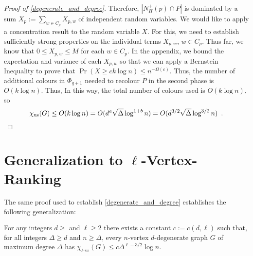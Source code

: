 \documentclass{patmorin}
\newcommand{\rn}[1]{\chi_{\operatorname{#1-vr}}}
\newcommand{\trn}{\chi_{\mathrm{us}}}
\newcommand{\lrn}{\rn{\ell}}
\begin{document}
\begin{proof}[Proof of \cref{degenerate_and_degree}]
  Therefore, $|N_H^+(p)\cap P|$ is dominated by a sum $X_p:=\sum_{w\in C_p} X_{p,w}$ of independent random variables.  We would like to apply a concentration result to the random variable $X$.  For this, we need to  establish sufficiently strong properties on the individual terms $X_{p,w}$, $w\in C_p$.  Thus far, we know that $0\le X_{p,w}\le M$ for each $w\in C_p$. In the appendix, we bound the expectation and variance of each $X_{p,w}$ so that we can apply a Bernstein Inequality to prove that $\Pr(X\ge ck\log n)\le n^{-\Omega(c)}$.  Thus, the number of additional colours in $\Phi_{q+1}$ needed to recolour $P$ in the second phase is $O(k\log n)$.  Thus, In this way, the total number of colours used is $O(k\log n)$, so
  \[
    \trn(G) \le O(k \log n) = O(d^a\sqrt{\Delta}\log^{1+b} n) = O(d^{3/2}\sqrt{\Delta}\log^{3/2} n) \enspace . \qedhere
  \]
\end{proof}

\section{Generalization to $\ell$-Vertex-Ranking}

The same proof used to establish \cref{degenerate_and_degree} establishes the following generalization:

\begin{thm}\label{l_degenerate_and_degree}
  For any integers $d\ge $ and $\ell\ge 2$ there exists a constant $c:=c(d,\ell)$ such that, for all integers $\Delta\ge d$ and $n\ge \Delta$, every $n$-vertex $d$-degenerate graph $G$ of maximum degree $\Delta$ has $\lrn(G)\le c\Delta^{\ell-3/2}\log n$.
\end{thm}
\end{document}
